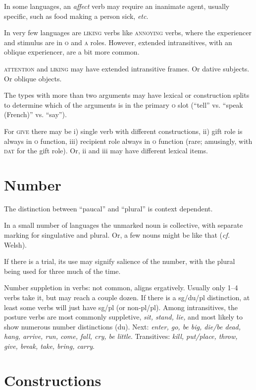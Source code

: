\documentclass[11pt]{article}
\newcommand{\E}[1]{\textit{#1}}   %
\newcommand{\I}[1]{\textsc{#1}}   %
\begin{document}
In some languages, an \E{affect} verb may require an inanimate agent,
usually specific, such as food making a person sick, \textit{etc}.

In very few languages are \I{liking} verbs like \I{annoying} verbs,
where the experiencer and stimulus are in \I{o} and \I{a} roles.
However, extended intransitives, with an oblique experiencer, are a
bit more common.

\I{attention} and \I{liking} may have extended intransitive frames.
Or dative subjects.  Or oblique objects.

The types with more than two arguments may have lexical or
construction splits to determine which of the arguments is in the
primary \I{o} slot (``tell'' vs. ``speak (French)'' vs. ``say'').

For \I{give} there may be i) single verb with different constructions,
ii) gift role is always in \I{o} function, iii) recipient role always
in \I{o} function (rare; amusingly, with \I{dat} for the gift role).
Or, ii and iii may have different lexical items.


\section{Number}

The distinction between ``paucal'' and ``plural'' is context
dependent. 

In a small number of languages the unmarked noun is collective, with
separate marking for singulative and plural.  Or, a few nouns might be
like that (\textit{cf.} Welsh).

If there is a trial, its use may signify salience of the number, with
the plural being used for three much of the time.

Number suppletion in verbs: not common, aligns ergatively.  Usually
only 1--4 verbs take it, but may reach a couple dozen.  If there is a
sg/du/pl distinction, at least some verbs will just have sg/pl (or
non-pl/pl).  Among intransitives, the posture verbs are most commonly
suppletive, \textit{sit, stand, lie,} and most likely to show numerous
number distinctions (du).  Next: \textit{enter, go, be big, die/be
  dead, hang, arrive, run, come, fall, cry, be little}.  Transitives:
\textit{kill, put/place, throw, give, break, take, bring, carry}.


\section{Constructions}
\end{document}
